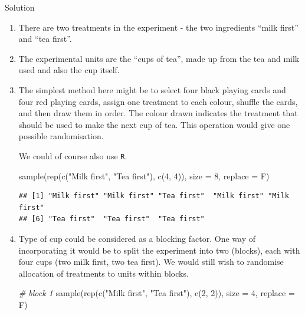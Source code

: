 \documentclass[
]{book}
\newenvironment{Shaded}{\begin{snugshade}}{\end{snugshade}}
\newcommand{\AttributeTok}[1]{\textcolor[rgb]{0.77,0.63,0.00}{#1}}
\newcommand{\CommentTok}[1]{\textcolor[rgb]{0.56,0.35,0.01}{\textit{#1}}}
\newcommand{\DecValTok}[1]{\textcolor[rgb]{0.00,0.00,0.81}{#1}}
\newcommand{\FunctionTok}[1]{\textcolor[rgb]{0.00,0.00,0.00}{#1}}
\newcommand{\NormalTok}[1]{#1}
\newcommand{\StringTok}[1]{\textcolor[rgb]{0.31,0.60,0.02}{#1}}
\theoremstyle{definition}
\theoremstyle{definition}
\theoremstyle{definition}
\theoremstyle{definition}
\theoremstyle{remark}
\begin{document}
Solution

\begin{enumerate}
\def\labelenumi{\alph{enumi}.}
\item
  There are two treatments in the experiment - the two ingredients ``milk first'' and ``tea first''.
\item
  The experimental units are the ``cups of tea'', made up from the tea and milk used and also the cup itself.
\item
  The simplest method here might be to select four black playing cards and four red playing cards, assign one treatment to each colour, shuffle the cards, and then draw them in order. The colour drawn indicates the treatment that should be used to make the next cup of tea. This operation would give one possible randomisation.

  We could of course also use \texttt{R}.

\begin{Shaded}
\begin{Highlighting}[]
\FunctionTok{sample}\NormalTok{(}\FunctionTok{rep}\NormalTok{(}\FunctionTok{c}\NormalTok{(}\StringTok{"Milk first"}\NormalTok{, }\StringTok{"Tea first"}\NormalTok{), }\FunctionTok{c}\NormalTok{(}\DecValTok{4}\NormalTok{, }\DecValTok{4}\NormalTok{)), }\AttributeTok{size =} \DecValTok{8}\NormalTok{, }\AttributeTok{replace =}\NormalTok{ F)}
\end{Highlighting}
\end{Shaded}

\begin{verbatim}
## [1] "Milk first" "Milk first" "Tea first"  "Milk first" "Milk first"
## [6] "Tea first"  "Tea first"  "Tea first"
\end{verbatim}
\item
  Type of cup could be considered as a blocking factor. One way of incorporating it would be to split the experiment into two (blocks), each with four cups (two milk first, two tea first). We would still wish to randomise allocation of treatments to units within blocks.

\begin{Shaded}
\begin{Highlighting}[]
\CommentTok{\# block 1}
\FunctionTok{sample}\NormalTok{(}\FunctionTok{rep}\NormalTok{(}\FunctionTok{c}\NormalTok{(}\StringTok{"Milk first"}\NormalTok{, }\StringTok{"Tea first"}\NormalTok{), }\FunctionTok{c}\NormalTok{(}\DecValTok{2}\NormalTok{, }\DecValTok{2}\NormalTok{)), }\AttributeTok{size =} \DecValTok{4}\NormalTok{, }\AttributeTok{replace =}\NormalTok{ F)}
\end{Highlighting}
\end{Shaded}


\end{enumerate}
\end{document}
